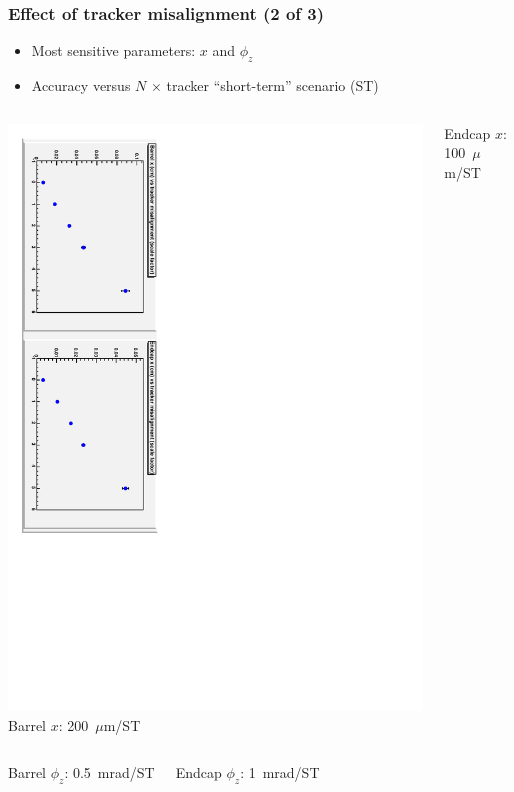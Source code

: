 \documentclass[compress]{beamer}
\begin{document}
\begin{frame}
\frametitle{Effect of tracker misalignment (2 of 3)}
\begin{itemize}
\item Most sensitive parameters: $x$ and $\phi_z$
\item Accuracy versus $N$ $\times$ tracker ``short-term'' scenario (ST)
\end{itemize}

\begin{columns}
\includegraphics[height=\linewidth, angle=90]{tracker_x_rmsonly.pdf}
Barrel $x$: 200~$\mu$m/ST

\vspace{0.1 cm}
Endcap $x$: 100~$\mu$m/ST
\end{columns}

\vfill
\begin{columns}
Barrel $\phi_z$: 0.5~mrad/ST

\vspace{0.1 cm}
Endcap $\phi_z$: 1~mrad/ST


\end{columns}
\end{frame}
\end{document}
